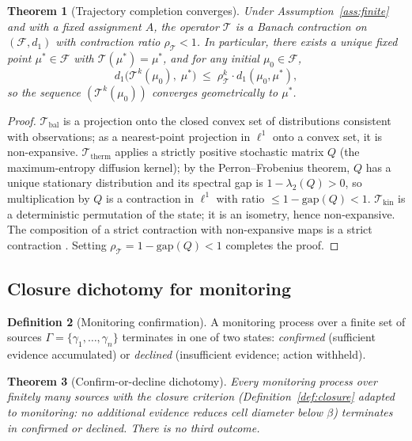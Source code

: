 \documentclass[11pt,twocolumn,a4paper]{article}
\theoremstyle{plain}
\newtheorem{theorem}{Theorem}[section]
\theoremstyle{definition}
\newtheorem{definition}[theorem]{Definition}
\theoremstyle{remark}
\newcommand{\T}{\mathcal{T}}
\newcommand{\F}{\mathcal{F}}
\newcommand{\floor}{\beta}
\begin{document}
\begin{theorem}[Trajectory completion converges]
\label{thm:traj}
Under Assumption~\ref{ass:finite} and with a fixed assignment $A$, the operator $\T$ is a Banach contraction on $(\F, d_1)$ with contraction ratio $\rho_{\T} < 1$. In particular, there exists a unique fixed point $\mu^* \in \F$ with $\T(\mu^*) = \mu^*$, and for any initial $\mu_0 \in \F$,
\[
  d_1\bigl(\T^k(\mu_0),\; \mu^*\bigr) \;\leq\; \rho_{\T}^k \cdot d_1(\mu_0, \mu^*),
\]
so the sequence $(\T^k(\mu_0))$ converges geometrically to $\mu^*$.
\end{theorem}

\begin{proof}
$\T_{\mathrm{bal}}$ is a projection onto the closed convex set of distributions consistent with observations; as a nearest-point projection in $\ell^1$ onto a convex set, it is non-expansive. $\T_{\mathrm{therm}}$ applies a strictly positive stochastic matrix $Q$ (the maximum-entropy diffusion kernel); by the Perron--Frobenius theorem, $Q$ has a unique stationary distribution and its spectral gap is $1 - \lambda_2(Q) > 0$, so multiplication by $Q$ is a contraction in $\ell^1$ with ratio $\leq 1 - \text{gap}(Q) < 1$. $\T_{\mathrm{kin}}$ is a deterministic permutation of the state; it is an isometry, hence non-expansive. The composition of a strict contraction with non-expansive maps is a strict contraction \cite{banach1922}. Setting $\rho_{\T} = 1 - \text{gap}(Q) < 1$ completes the proof.
\end{proof}

\subsection{Closure dichotomy for monitoring}

\begin{definition}[Monitoring confirmation]
\label{def:confirm}
A monitoring process over a finite set of sources $\Gamma = \{\gamma_1, \ldots, \gamma_n\}$ terminates in one of two states: \emph{confirmed} (sufficient evidence accumulated) or \emph{declined} (insufficient evidence; action withheld).
\end{definition}

\begin{theorem}[Confirm-or-decline dichotomy]
\label{thm:dichotomy}
Every monitoring process over finitely many sources with the closure criterion (Definition~\ref{def:closure} adapted to monitoring: no additional evidence reduces cell diameter below $\floor$) terminates in confirmed or declined. There is no third outcome.
\end{theorem}
\end{document}
